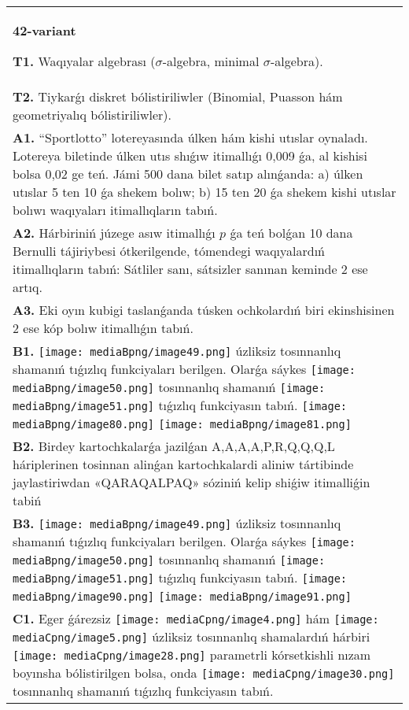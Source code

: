 \documentclass{article}
\begin{document}
\begin{tabular}{m{17cm}}
\textbf{42-variant}
\newline

\textbf{T1.} Waqıyalar algebrası ($\sigma$-algebra, minimal $\sigma$-algebra).
 \\
\textbf{T2.} Tiykarǵı diskret bólistiriliwler (Binomial, Puasson hám geometriyalıq bólistiriliwler).
 \\
\textbf{A1.} 
“Sportlotto” lotereyasında úlken hám kishi utıslar oynaladı. Lotereya biletinde úlken utıs shıǵıw itimallıǵı 0,009 ǵa, al kishisi bolsa 0,02 ge teń. Jámi 500 dana bilet satıp alınǵanda: a) úlken utıslar 5 ten 10 ǵa shekem bolıw; b) 15 ten 20 ǵa shekem kishi utıslar bolıwı waqıyaları itimallıqların tabıń.
 \\
\textbf{A2.} Hárbiriniń júzege asıw itimallıǵı $p$ ǵa teń bolǵan 10 dana Bernulli tájiriybesi ótkerilgende, tómendegi waqıyalardıń itimallıqların tabıń: Sátliler sanı, sátsizler sanınan keminde 2 ese artıq.
 \\
\textbf{A3.} Eki oyın kubigi taslanǵanda túsken ochkolardıń biri ekinshisinen 2 ese kóp bolıw itimallıǵın tabıń.
 \\
\textbf{B1.} \texttt{[image: mediaBpng/image49.png]} úzliksiz tosınnanlıq shamanıń tıǵızlıq funkciyaları berilgen. Olarǵa sáykes \texttt{[image: mediaBpng/image50.png]} tosınnanlıq shamanıń \texttt{[image: mediaBpng/image51.png]} tıǵızlıq funkciyasın tabıń. \texttt{[image: mediaBpng/image80.png]} \texttt{[image: mediaBpng/image81.png]}
 \\
\textbf{B2.} Birdey kartochkalarǵa jazilǵan A,A,A,A,P,R,Q,Q,Q,L háriplerinen tosinnan alinǵan kartochkalardi aliniw tártibinde jaylastiriwdan «QARAQALPAQ» sóziniń kelip shiǵiw itimalliǵin tabiń
 \\
\textbf{B3.} \texttt{[image: mediaBpng/image49.png]} úzliksiz tosınnanlıq shamanıń tıǵızlıq funkciyaları berilgen. Olarǵa sáykes \texttt{[image: mediaBpng/image50.png]} tosınnanlıq shamanıń \texttt{[image: mediaBpng/image51.png]} tıǵızlıq funkciyasın tabıń. \texttt{[image: mediaBpng/image90.png]} \texttt{[image: mediaBpng/image91.png]}
 \\
\textbf{C1.} Eger ǵárezsiz \texttt{[image: mediaCpng/image4.png]} hám \texttt{[image: mediaCpng/image5.png]} úzliksiz tosınnanlıq shamalardıń hárbiri \texttt{[image: mediaCpng/image28.png]} parametrli kórsetkishli nızam boyınsha bólistirilgen bolsa, onda \texttt{[image: mediaCpng/image30.png]} tosınnanlıq shamanıń tıǵızlıq funkciyasın tabıń.

\end{tabular}
\end{document}
